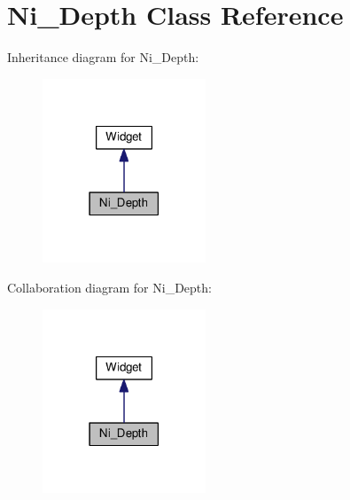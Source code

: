 \hypertarget{class_ni___depth}{}\section{Ni\+\_\+\+Depth Class Reference}
\label{class_ni___depth}


Inheritance diagram for Ni\+\_\+\+Depth\+:\nopagebreak
\begin{figure}[H]
\begin{center}
\leavevmode
\includegraphics[width=138pt]{class_ni___depth__inherit__graph}
\end{center}
\end{figure}


Collaboration diagram for Ni\+\_\+\+Depth\+:\nopagebreak
\begin{figure}[H]
\begin{center}
\leavevmode
\includegraphics[width=138pt]{class_ni___depth__coll__graph}
\end{center}
\end{figure}
